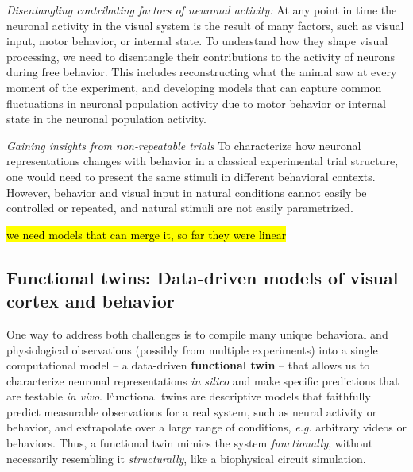 \documentclass[B2,COG]{ercgrant}
\begin{document}
\textit{Disentangling contributing factors of neuronal activity:}
At any point in time the neuronal activity in the visual system is the result of many factors, such as visual input, motor behavior, or internal state. 
To understand how they shape visual processing, we need to disentangle their contributions to the activity of neurons during free behavior. 
This includes reconstructing what the animal saw at every moment of the experiment, and developing models that can capture common fluctuations in neuronal population activity due to motor behavior or internal state in the neuronal population activity.

\textit{Gaining insights from non-repeatable trials} 
To characterize how neuronal representations changes with behavior in a classical experimental trial structure, one would need to present the same stimuli in different behavioral contexts. 
However, behavior and visual input in natural conditions cannot easily be controlled or repeated, and natural stimuli are not easily parametrized.

\hl{we need models that can merge it, so far they were linear}

\subsection{Functional twins: Data-driven models of visual cortex and behavior}
One way to address both challenges is to compile many unique behavioral and physiological observations (possibly from multiple experiments) into a single computational model -- a data-driven \textbf{functional twin} -- that allows us to characterize neuronal representations \textit{in silico} and make specific predictions that are testable \textit{in vivo}. 
Functional twins are descriptive models that faithfully predict measurable observations for a real system, such as neural activity or behavior, and extrapolate over a large range of conditions, \textit{e.g.} arbitrary videos or behaviors. 
Thus, a functional twin mimics the system \textit{functionally}, without necessarily resembling it \textit{structurally}, like a biophysical circuit simulation.  
\end{document}
